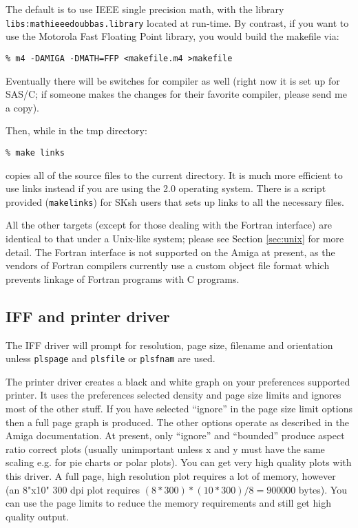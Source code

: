 The default is to use IEEE single precision math, with the library {\tt
libs:mathieeedoubbas.library} located at run-time.  By contrast, if you want
to use the Motorola Fast Floating Point library, you would build the
makefile via:
\begin{verbatim}
% m4 -DAMIGA -DMATH=FFP <makefile.m4 >makefile
\end{verbatim}

Eventually there will be switches for compiler as well (right now it is set
up for SAS/C; if someone makes the changes for their favorite compiler,
please send me a copy).

Then, while in the tmp directory:
\begin{verbatim}
% make links
\end{verbatim}
copies all of the source files to the current directory.  It is much more
efficient to use links instead if you are using the 2.0 operating system.
There is a script provided ({\tt makelinks}) for SKsh users that sets
up links to all the necessary files.

All the other targets (except for those dealing with the Fortran interface)
are identical to that under a Unix-like system; please see Section
\ref{sec:unix} for more detail.  The Fortran interface is not supported on
the Amiga at present, as the vendors of Fortran compilers currently use a
custom object file format which prevents linkage of Fortran programs with C
programs.

\subsection{IFF and printer driver}

The IFF driver will prompt for resolution, page size, filename and
orientation unless {\tt plspage} and {\tt plsfile} or {\tt plsfnam}
are used.

The printer driver creates a black and white graph on your preferences
supported printer.  It uses the preferences selected density and page size
limits and ignores most of the other stuff.  If you have selected ``ignore''
in the page size limit options then a full page graph is produced.  The
other options operate as described in the Amiga documentation.  At present,
only ``ignore'' and ``bounded'' produce aspect ratio correct plots (usually
unimportant unless x and y must have the same scaling e.g. for pie charts or
polar plots).  You can get very high quality plots with this driver.  A full
page, high resolution plot requires a lot of memory, however (an 8"x10" 300
dpi plot requires $(8*300)*(10*300)/8 = 900000$ bytes).  You can use the page
limits to reduce the memory requirements and still get high quality output.

